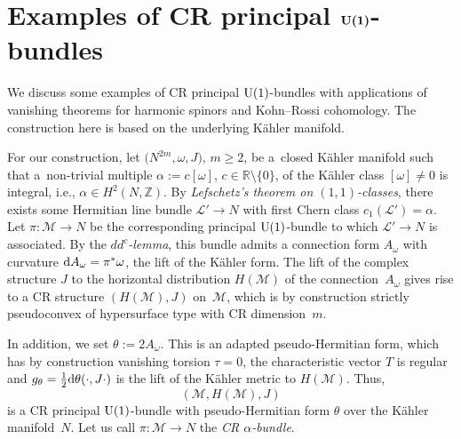 \documentclass[10pt,a4paper]{amsart}
\numberwithin{equation}{section}
\newcommand{\RR}{\mathbb{R}}
\newcommand{\ZZ}{\mathbb{Z}}
\begin{document}
\section[Examples of CR principal U(1)-bundles]{Examples of CR principal $\boldsymbol{{\rm U}(1)}$-bundles} \label{Sec12}

We discuss some examples of CR principal ${\rm U}(1)$-bundles with applications of vanishing theorems
for harmonic spinors and Kohn--Rossi cohomology. The construction here is based on the underlying K\"ahler manifold.

For our construction, let $\big(N^{2m},\omega,J\big)$, $m\geq 2$,
be a~closed K\"ahler manifold such that a~non-trivial multiple $\alpha:=c[\omega]$, $c\in\RR\setminus \{0\}$, of the K\"ahler class $[\omega]\neq 0$
is integral, i.e., $\alpha\in H^2(N,\ZZ)$. By {\em Lefschetz's theorem on $(1,1)$-classes}, there exists
some Hermitian line bundle $\mathcal{L}'\to N$ with first Chern class $c_1(\mathcal{L}')=\alpha$.
Let $\pi\colon \mathcal{M}\to N$ be the corresponding
principal ${\rm U}(1)$-bundle to which $\mathcal{L}'\to N$ is associated. By the {\em $dd^c$-lemma},
this bundle admits a connection form $A_\omega$ with curvature ${\rm d}A_\omega=\pi^*\omega$,
the lift of the K\"ahler form.
The lift of the complex structure $J$ to the horizontal distribution $H(\mathcal{M})$ of the connection~$A_\omega$ gives rise to a CR structure $(H(\mathcal{M}),J)$
on~$\mathcal{M}$, which is by construction strictly pseudoconvex of hypersurface type with CR dimension~$m$.

In addition, we set $\theta:=2A_\omega$. This is an adapted pseudo-Hermitian form, which has by construction vanishing torsion $\tau=0$,
the characteristic vector $T$ is regular and $g_\theta=\frac{1}{2}{\rm d}\theta(\cdot,J\cdot)$
is the lift of the K\"ahler metric to $H(\mathcal{M})$. Thus,
\[
(\mathcal{M}, H(\mathcal{M}), J)
\]
is a CR principal ${\rm U}(1)$-bundle with pseudo-Hermitian form $\theta$ over the K\"ahler manifold~$N$.
Let us call $\pi\colon \mathcal{M}\to N$ the {\em CR $\alpha$-bundle}.
\end{document}
